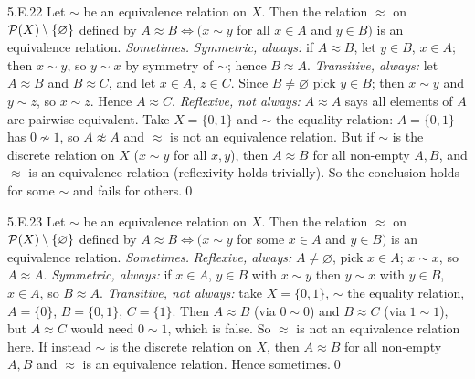 \begin{bookex}[essential]{5.E.22}
Let $\sim$ be an equivalence relation on $X$. Then the relation $\approx$ on $\mathcal{P}(X)\setminus\{\varnothing\}$ defined by $A\approx B\Leftrightarrow(x\sim y$ for all $x\in A$ and $y\in B)$ is an equivalence relation.
\solution
\emph{Sometimes.} \emph{Symmetric, always:} if $A\approx B$, let $y\in B$, $x\in A$; then $x\sim y$, so $y\sim x$ by symmetry of $\sim$; hence $B\approx A$. \emph{Transitive, always:} let $A\approx B$ and $B\approx C$, and let $x\in A$, $z\in C$. Since $B\ne\varnothing$ pick $y\in B$; then $x\sim y$ and $y\sim z$, so $x\sim z$. Hence $A\approx C$. \emph{Reflexive, not always:} $A\approx A$ says all elements of $A$ are pairwise equivalent. Take $X=\{0,1\}$ and $\sim$ the equality relation: $A=\{0,1\}$ has $0\not\sim1$, so $A\not\approx A$ and $\approx$ is not an equivalence relation. But if $\sim$ is the discrete relation on $X$ ($x\sim y$ for all $x,y$), then $A\approx B$ for all non-empty $A,B$, and $\approx$ is an equivalence relation (reflexivity holds trivially). So the conclusion holds for some $\sim$ and fails for others.\qed
\end{bookex}

\begin{bookex}[essential]{5.E.23}
Let $\sim$ be an equivalence relation on $X$. Then the relation $\approx$ on $\mathcal{P}(X)\setminus\{\varnothing\}$ defined by $A\approx B\Leftrightarrow(x\sim y$ for some $x\in A$ and $y\in B)$ is an equivalence relation.
\solution
\emph{Sometimes.} \emph{Reflexive, always:} $A\ne\varnothing$, pick $x\in A$; $x\sim x$, so $A\approx A$. \emph{Symmetric, always:} if $x\in A$, $y\in B$ with $x\sim y$ then $y\sim x$ with $y\in B$, $x\in A$, so $B\approx A$. \emph{Transitive, not always:} take $X=\{0,1\}$, $\sim$ the equality relation, $A=\{0\}$, $B=\{0,1\}$, $C=\{1\}$. Then $A\approx B$ (via $0\sim0$) and $B\approx C$ (via $1\sim1$), but $A\approx C$ would need $0\sim1$, which is false. So $\approx$ is not an equivalence relation here. If instead $\sim$ is the discrete relation on $X$, then $A\approx B$ for all non-empty $A,B$ and $\approx$ is an equivalence relation. Hence sometimes.\qed
\end{bookex}

